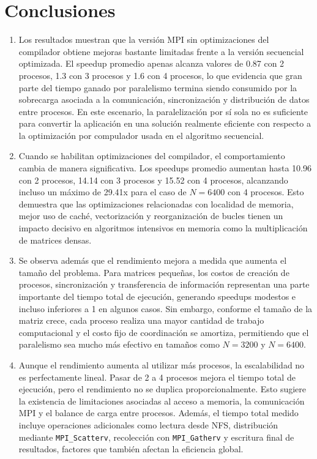 
\section{Conclusiones}
\label{sec:conclusiones}

\begin{enumerate}
    \item Los resultados muestran que la versión MPI sin optimizaciones del compilador obtiene mejoras bastante limitadas frente a la versión secuencial optimizada. El speedup promedio apenas alcanza valores de 0.87 con 2 procesos, 1.3 con 3 procesos y 1.6 con 4 procesos, lo que evidencia que gran parte del tiempo ganado por paralelismo termina siendo consumido por la sobrecarga asociada a la comunicación, sincronización y distribución de datos entre procesos. En este escenario, la paralelización por sí sola no es suficiente para convertir la aplicación en una solución realmente eficiente con respecto a la optimización por compulador usada en el algoritmo secuencial.

    \item Cuando se habilitan optimizaciones del compilador, el comportamiento cambia de manera significativa. Los speedups promedio aumentan hasta 10.96 con 2 procesos, 14.14 con 3 procesos y 15.52 con 4 procesos, alcanzando incluso un máximo de 29.41x para el caso de \(N = 6400\) con 4 procesos. Esto demuestra que las optimizaciones relacionadas con localidad de memoria, mejor uso de caché, vectorización y reorganización de bucles tienen un impacto decisivo en algoritmos intensivos en memoria como la multiplicación de matrices densas.

    \item Se observa además que el rendimiento mejora a medida que aumenta el tamaño del problema. Para matrices pequeñas, los costos de creación de procesos, sincronización y transferencia de información representan una parte importante del tiempo total de ejecución, generando speedups modestos e incluso inferiores a 1 en algunos casos. Sin embargo, conforme el tamaño de la matriz crece, cada proceso realiza una mayor cantidad de trabajo computacional y el costo fijo de coordinación se amortiza, permitiendo que el paralelismo sea mucho más efectivo en tamaños como \(N = 3200\) y \(N = 6400\).

    \item Aunque el rendimiento aumenta al utilizar más procesos, la escalabilidad no es perfectamente lineal. Pasar de 2 a 4 procesos mejora el tiempo total de ejecución, pero el rendimiento no se duplica proporcionalmente. Esto sugiere la existencia de limitaciones asociadas al acceso a memoria, la comunicación MPI y el balance de carga entre procesos. Además, el tiempo total medido incluye operaciones adicionales como lectura desde NFS, distribución mediante \texttt{MPI\_Scatterv}, recolección con \texttt{MPI\_Gatherv} y escritura final de resultados, factores que también afectan la eficiencia global.


\end{enumerate}
